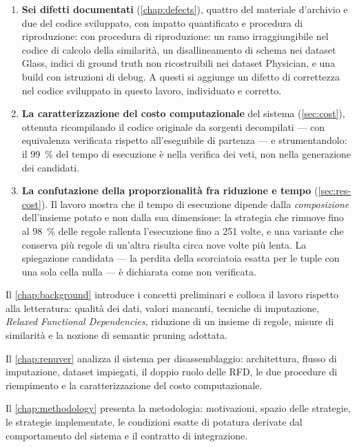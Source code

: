 \begin{enumerate}[leftmargin=1.6em]
    \item \textbf{Sei difetti documentati} (\autoref{chap:defects}), quattro del materiale
    d'archivio e due del codice sviluppato, con impatto quantificato e procedura di
    riproduzione: con procedura di
    riproduzione: un ramo irraggiungibile nel codice di calcolo della similarità, un
    disallineamento di schema nei dataset Glass, indici di ground truth non ricostruibili nei
    dataset Physician, e una build con istruzioni di debug. A questi si aggiunge un difetto di
    correttezza nel codice sviluppato in questo lavoro, individuato e corretto.

    \item \textbf{La caratterizzazione del costo computazionale} del sistema
    (\autoref{sec:cost}), ottenuta ricompilando il codice originale da sorgenti decompilati ---
    con equivalenza verificata rispetto all'eseguibile di partenza --- e strumentandolo: il
    \SI{99}{\percent} del tempo di esecuzione è nella verifica dei veti, non nella generazione
    dei candidati.

    \item \textbf{La confutazione della proporzionalità fra riduzione e tempo}
    (\autoref{sec:res-cost}). Il lavoro mostra che il tempo di esecuzione dipende dalla
    \emph{composizione} dell'insieme potato e non dalla sua dimensione: la strategia che rimuove
    fino al \SI{98}{\percent} delle regole rallenta l'esecuzione fino a \num{251} volte, e una
    variante che conserva più regole di un'altra risulta circa nove volte più lenta. La
    spiegazione candidata --- la perdita della scorciatoia esatta per le tuple con una sola cella
    nulla --- è dichiarata come non verificata.
\end{enumerate}


Il \autoref{chap:background} introduce i concetti preliminari e colloca il lavoro rispetto alla
letteratura: qualità dei dati, valori mancanti, tecniche di imputazione, \emph{Relaxed Functional
Dependencies}, riduzione di un insieme di regole, misure di similarità e la nozione di semantic
pruning adottata.

Il \autoref{chap:renuver} analizza il sistema \renuver{} per disassemblaggio: architettura, flusso
di imputazione, dataset impiegati, il doppio ruolo delle RFD, le due procedure di riempimento e la
caratterizzazione del costo computazionale.

Il \autoref{chap:methodology} presenta la metodologia: motivazioni, spazio delle strategie, le
strategie implementate, le condizioni esatte di potatura derivate dal comportamento del sistema e
il contratto di integrazione.

